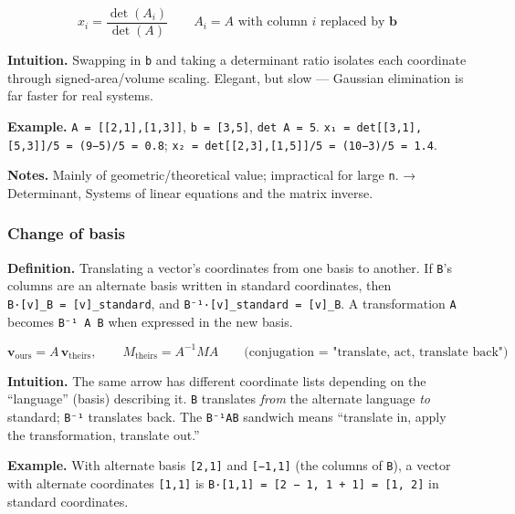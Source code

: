 \documentclass[
  10pt,
  letterpaper,
  onecolumn]{article}
\begin{document}
\begin{equation*}
x_i=\frac{\det(A_i)}{\det(A)}
\qquad A_i=A \text{ with column } i \text{ replaced by } \mathbf{b}
\end{equation*}

\textbf{Intuition.} Swapping in \texttt{b} and taking a determinant
ratio isolates each coordinate through signed-area/volume scaling.
Elegant, but slow --- Gaussian elimination is far faster for real
systems.

\textbf{Example.} \texttt{A\ =\ {[}{[}2,1{]},{[}1,3{]}{]}},
\texttt{b\ =\ {[}3,5{]}}, \texttt{det\ A\ =\ 5}.
\texttt{x₁\ =\ det{[}{[}3,1{]},{[}5,3{]}{]}/5\ =\ (9−5)/5\ =\ 0.8};
\texttt{x₂\ =\ det{[}{[}2,3{]},{[}1,5{]}{]}/5\ =\ (10−3)/5\ =\ 1.4}.

\textbf{Notes.} Mainly of geometric/theoretical value; impractical for
large \texttt{n}. → Determinant, Systems of linear equations and the
matrix inverse.

\hypertarget{change-of-basis}{%
\subsubsection{Change of basis}\label{change-of-basis}}

\textbf{Definition.} Translating a vector's coordinates from one basis
to another. If \texttt{B}'s columns are an alternate basis written in
standard coordinates, then \texttt{B·{[}v{]}\_B\ =\ {[}v{]}\_standard},
and \texttt{B⁻¹·{[}v{]}\_standard\ =\ {[}v{]}\_B}. A transformation
\texttt{A} becomes \texttt{B⁻¹\ A\ B} when expressed in the new basis.

\begin{equation*}
\mathbf{v}_{\text{ours}}=A\,\mathbf{v}_{\text{theirs}},
\qquad
M_{\text{theirs}}=A^{-1}MA
\qquad\text{(conjugation = "translate, act, translate back")}
\end{equation*}

\textbf{Intuition.} The same arrow has different coordinate lists
depending on the ``language'' (basis) describing it. \texttt{B}
translates \emph{from} the alternate language \emph{to} standard;
\texttt{B⁻¹} translates back. The \texttt{B⁻¹AB} sandwich means
``translate in, apply the transformation, translate out.''

\textbf{Example.} With alternate basis \texttt{{[}2,1{]}} and
\texttt{{[}−1,1{]}} (the columns of \texttt{B}), a vector with alternate
coordinates \texttt{{[}1,1{]}} is
\texttt{B·{[}1,1{]}\ =\ {[}2\ −\ 1,\ 1\ +\ 1{]}\ =\ {[}1,\ 2{]}} in
standard coordinates.
\end{document}
